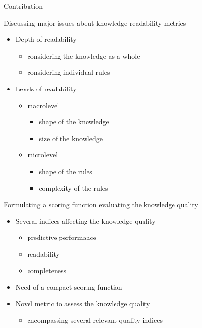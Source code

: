 \documentclass{beamer}
\newcommand{\eg}{\item[e.g.]}
\newcommand{\lookat}{\item[\ding{43}]}
\begin{document}
\begin{frame}[c,allowframebreaks]{Contribution}
	\vfill
	\begin{block}{Discussing major issues about knowledge readability metrics}
		\medskip
		\begin{itemize}
			\item Depth of readability
			\begin{itemize}
				\item considering the knowledge as a whole
				\item considering individual rules
			\end{itemize}
			\medskip
			\lookat Levels of readability
			\begin{itemize}
				\item macrolevel
				\begin{itemize}
					\eg shape of the knowledge
					\eg size of the knowledge
				\end{itemize}
				\item microlevel
				\begin{itemize}
					\eg shape of the rules
					\eg complexity of the rules
				\end{itemize}
			\end{itemize}
		\end{itemize}
		\medskip
	\end{block}
	\vfill
	
	\framebreak
	
	\vfill 
	
	\begin{block}{Formulating a scoring function evaluating the knowledge quality}
		\medskip
		\begin{itemize}
			\item Several indices affecting the knowledge quality
			\begin{itemize}
				\eg predictive performance
				\eg readability
				\eg completeness
			\end{itemize}
			\medskip
			\item Need of a compact scoring function
			\medskip
			\lookat Novel metric to assess the knowledge quality
			\begin{itemize}
				\item encompassing several relevant quality indices
			\end{itemize}
		\end{itemize}
		\medskip
	\end{block}
\end{frame}
\end{document}
